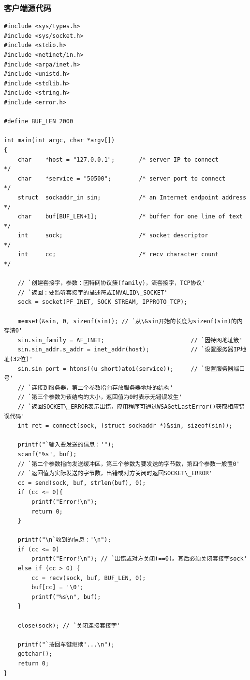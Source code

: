 \documentclass[logo,reportComp]{thesis}
\begin{document}
\subsubsection{客户端源代码}
\begin{lstlisting}
#include <sys/types.h>
#include <sys/socket.h>
#include <stdio.h>
#include <netinet/in.h>
#include <arpa/inet.h>
#include <unistd.h>
#include <stdlib.h>
#include <string.h>
#include <error.h>

#define BUF_LEN 2000

int main(int argc, char *argv[])
{
    char    *host = "127.0.0.1";       /* server IP to connect         */
    char    *service = "50500";        /* server port to connect       */
    struct  sockaddr_in sin;           /* an Internet endpoint address */
    char    buf[BUF_LEN+1];            /* buffer for one line of text  */
    int     sock;                      /* socket descriptor            */
    int     cc;                        /* recv character count         */

    // `创建套接字，参数：因特网协议簇(family)，流套接字，TCP协议'
    // `返回：要监听套接字的描述符或INVALID\_SOCKET'
    sock = socket(PF_INET, SOCK_STREAM, IPPROTO_TCP);

    memset(&sin, 0, sizeof(sin)); // `从\&sin开始的长度为sizeof(sin)的内存清0'
    sin.sin_family = AF_INET;                         // `因特网地址簇'
    sin.sin_addr.s_addr = inet_addr(host);            // `设置服务器IP地址(32位)'
    sin.sin_port = htons((u_short)atoi(service));     // `设置服务器端口号'
    // `连接到服务器，第二个参数指向存放服务器地址的结构'
    // `第三个参数为该结构的大小，返回值为0时表示无错误发生'
    // `返回SOCKET\_ERROR表示出错，应用程序可通过WSAGetLastError()获取相应错误代码'
    int ret = connect(sock, (struct sockaddr *)&sin, sizeof(sin));

    printf("`输入要发送的信息：'");
    scanf("%s", buf);
    // `第二个参数指向发送缓冲区，第三个参数为要发送的字节数，第四个参数一般置0'
    // `返回值为实际发送的字节数，出错或对方关闭时返回SOCKET\_ERROR'
    cc = send(sock, buf, strlen(buf), 0);
    if (cc <= 0){
        printf("Error!\n");
        return 0;
    }

    printf("\n`收到的信息：'\n");
    if (cc <= 0)
        printf("Error!\n"); // `出错或对方关闭(==0)。其后必须关闭套接字sock'
    else if (cc > 0) {
        cc = recv(sock, buf, BUF_LEN, 0);
        buf[cc] = '\0';
        printf("%s\n", buf);
    }

    close(sock); // `关闭连接套接字'

    printf("`按回车键继续'...\n");
    getchar();
    return 0;
}
\end{lstlisting}
\end{document}
